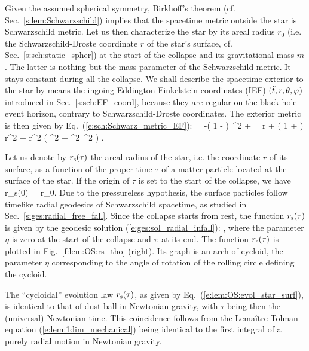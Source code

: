 Given the assumed spherical symmetry, Birkhoff's theorem (cf. Sec.~\ref{s:lem:Schwarzschild})
implies that the spacetime metric outside the star
is Schwarzschild metric.
Let us then characterize the star by its areal radius $r_0$
(i.e. the Schwarzschild-Droste coordinate $r$ of the star's surface, cf. Sec.~\ref{s:sch:static_spher})
at the start of the collapse and its gravitational mass $m$. The latter
is nothing but the mass parameter of the Schwarzschild metric. It stays
constant during all the collapse.
We shall describe the spacetime exterior
to the star by means the ingoing Eddington-Finkelstein coordinates (IEF)
$({\tilde t}, r, \theta,\varphi)$
introduced in Sec.~\ref{s:sch:EF_coord}, because they are regular on the
black hole event horizon, contrary to Schwarzschild-Droste coordinates.
The exterior metric is then given by Eq.~(\ref{e:sch:Schwarz_metric_EF}):
\be \label{e:lem:OS:exterior_metric}
     =
            -\left( 1 -  \right)\, \dd \ti^2
            +  \, \dd \ti \, \dd r
            + \left( 1 +  \right)\, \dd r^2
        + r^2 \left( \dd\th^2 + \sin^2\th\, \dd\ph^2 \right) .
\ee

Let us denote by $r_{\rm s}(\tau)$ the areal radius of the star, i.e. the coordinate $r$
of its surface, as a function of the proper time $\tau$ of a matter particle
located at the surface of the star. If the origin of $\tau$ is set to
the start of the collapse, we have
\be
    r_{\rm s}(0) = r_0.
\ee
Due to the pressureless hypothesis, the surface particles follow timelike radial geodesics
of Schwarzschild spacetime, as studied in Sec.~\ref{s:ges:radial_free_fall}.
Since the collapse starts from rest, the function $r_{\rm s}(\tau)$ is
given by the geodesic solution (\ref{e:ges:sol_radial_infall}):
\be \label{e:lem:OS:evol_star_surf}
     \leq \eta \leq \pi ,
\ee
where the parameter $\eta$ is zero at the start of the collapse and $\pi$ at its end.
The function $r_{\rm s}(\tau)$ is plotted in Fig.~\ref{f:lem:OS:rs_tho} (right).
Its graph is an arch of cycloid, the parameter $\eta$ corresponding
to the angle of rotation of the rolling circle defining the cycloid.
\begin{remark} \label{r:lem:OS:cycloid}
The ``cycloidal'' evolution law $r_{\rm s}(\tau)$, as given by Eq.~(\ref{e:lem:OS:evol_star_surf}),
is identical to that of dust ball in Newtonian gravity, with $\tau$ being then the (universal) Newtonian
time. This coincidence follows from the Lemaître-Tolman equation (\ref{e:lem:1dim_mechanical})
being identical to the first integral of a purely radial motion in Newtonian gravity.
\end{remark}

